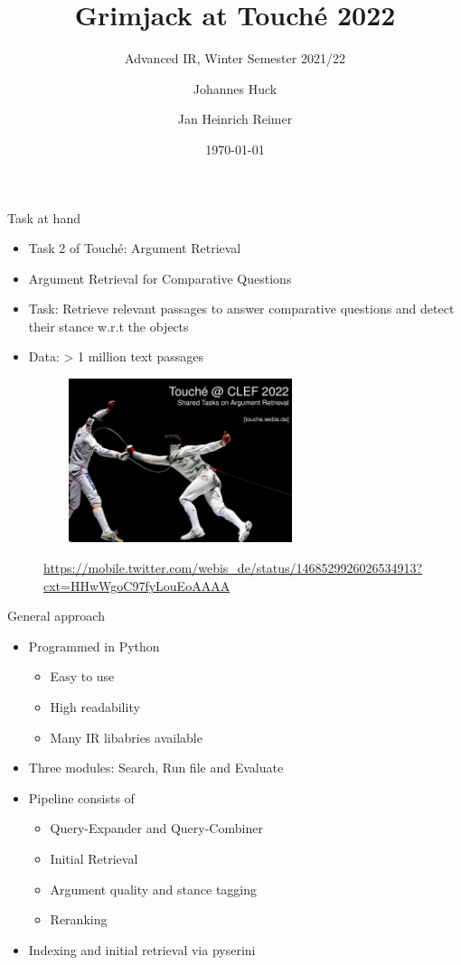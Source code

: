 \documentclass[english]{mlutalk}
\title{Grimjack at Touché 2022}
\subtitle{Advanced IR, Winter Semester 2021/22}
\author{Johannes Huck \and Jan Heinrich Reimer}
\institute{Martin Luther University Halle-Wittenberg}
\date{\today}
\begin{document}
\titleframe

\begin{frame}{Task at hand}  
  \begin{itemize}
    \item Task 2 of Touché: Argument Retrieval
    \item Argument Retrieval for Comparative Questions
    \item Task: Retrieve relevant passages to answer comparative questions and detect their stance w.r.t the objects
    \item Data: > 1 million text passages  
  \end{itemize}
  \begin{figure}
      \centering
      \includegraphics[height=4.8cm, width=8cm]{figures/touche}\\
      \begin{footnotesize}
        \url{https://mobile.twitter.com/webis_de/status/1468529926026534913?cxt=HHwWgoC97fyLouEoAAAA}
      \end{footnotesize}  
  \end{figure}
\end{frame}

\begin{frame}{General approach}
  \begin{itemize}
    \item Programmed in Python
    \begin{itemize}
        \item Easy to use
        \item High readability
        \item Many IR libabries available
    \end{itemize}
    \item Three modules: Search, Run file  and Evaluate
    \item Pipeline consists of
    \begin{itemize}
        \item Query-Expander and Query-Combiner
        \item Initial Retrieval
        \item Argument quality and stance tagging
        \item Reranking
    \end{itemize}
    \item Indexing and initial retrieval via pyserini~\cite{LinMLYPN2021}
  \end{itemize}
\end{frame}
\end{document}
